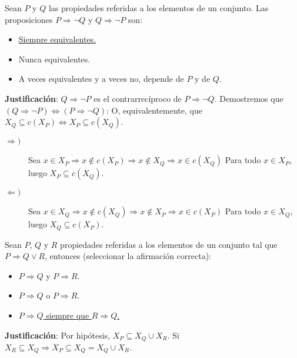 \documentclass[12pt]{article}
\newcounter{ejercicio}[section] %
\newcounter{ejercicio}
\begin{document}
    \newpage
    \begin{ejercicio}
        Sean $P$ y $Q$ las propiedades referidas a los elementos de un conjunto. Las proposiciones $P \Rightarrow \neg Q$ y $Q \Rightarrow \neg P$ son:
        \begin{itemize}
            \item \underline{Siempre equivalentes.}
            \item Nunca equivalentes.
            \item A veces equivalentes y a veces no, depende de $P$ y de $Q$.
        \end{itemize}

        \noindent
        \textbf{Justificación}:
        $Q \Rightarrow \neg P$ es el contrarrecíproco de $P \Rightarrow \neg Q$.\newline
        Demostremos que $(Q \Rightarrow \neg P) \Leftrightarrow (P \Rightarrow \neg Q)$:\newline
        O, equivalentemente, que $X_Q \subseteq c(X_P) \Leftrightarrow X_P \subseteq c(X_Q)$.
        \begin{description}
            \item [$\Rightarrow)$]
                Sea $ x \in X_P \Rightarrow x \notin c(X_P) \Rightarrow x \notin X_Q \Rightarrow x \in c(X_Q)$\newline
                Para todo $x \in X_P$, luego $X_P \subseteq c(X_Q)$.
            \item [$\Leftarrow)$]
                Sea $ x \in X_Q \Rightarrow x \notin c(X_Q) \Rightarrow x \notin X_P \Rightarrow x \in c(X_P)$\newline
                Para todo $x \in X_Q$, luego $X_Q \subseteq c(X_P)$.
        \end{description}
    \end{ejercicio}

    \begin{ejercicio}
        Sean $P$, $Q$ y $R$ propiedades referidas a los elementos de un conjunto tal que $P \Rightarrow Q \lor R$, entonces (seleccionar la afirmación correcta):
        \begin{itemize}
            \item $P \Rightarrow Q$ y $P \Rightarrow R$.
            \item $P \Rightarrow Q$ o $P \Rightarrow R$.
            \item \underline{$P \Rightarrow Q$ siempre que $R \Rightarrow Q$.}
        \end{itemize}

        \noindent
        \textbf{Justificación}:
        Por hipótesis, $X_P \subseteq X_Q \cup X_R$.\newline
        Si $X_R \subseteq X_Q \Rightarrow X_P \subseteq X_Q = X_Q \cup X_R$.

    \end{ejercicio}
    
\end{document}
